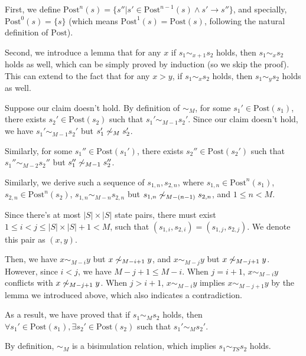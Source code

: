 First, we define $\text{Post}^{n}(s)=\{s'' | s' \in \text{Post}^{n-1}(s) \wedge s' \to s'' \}$, and
specially, $\text{Post}^{0}(s)=\{s\}$ (which means $\text{Post}^{1}(s)=\text{Post}(s)$, following the
natural definition of $\text{Post}$).

Second, we introduce a lemma that for any $x$ if $s_1 \sim_{x + 1} s_2$ holds, then
$s_1 \sim_{x} s_2$ holds as well, which can be simply proved by induction (so we skip the proof).
This can extend to the fact that for any $x > y$, if $s_1 \sim_{x} s_2$ holds, then $s_1 \sim_{y} s_2$ holds as well.

Suppose our claim doesn't hold. By definition of $\sim_{M}$, for some $s_1' \in \text{Post}(s_1)$, there
exists $s_2' \in \text{Post}(s_2)$ such that $s_1' \sim_{M -1} s_2'$.
Since our claim doesn't hold, we have $s_1' \sim_{M-1} s_2'$ but $s_1' \not \sim_{M} s_2'$.

Similarly, for some $s_1'' \in \text{Post}(s_1')$, there exists $s_2'' \in \text{Post}(s_2')$ such that
$s_1'' \sim_{M-2} s_2''$ but $s_1'' \not \sim_{M-1} s_2''$.

Similarly, we derive such a sequence of $s_{1,n}, s_{2,n}$,
where $s_{1,n} \in \text{Post}^{n}(s_1)$, $s_{2,n} \in \text{Post}^{n}(s_2)$,
$s_{1,n} \sim_{M-n} s_{2,n}$ but $s_{1,n} \not \sim_{M-(n-1)} s_{2,n}$, and $1 \leq n < M$.

Since there's at most $|S| \times |S|$ state pairs, there must exist $1 \leq i < j \leq |S| \times |S| + 1 < M$,
such that $(s_{1,i}, s_{2,i}) = (s_{1,j}, s_{2,j})$. We denote this pair as $(x, y)$.

Then, we have $x \sim_{M - i} y$ but $x \not \sim_{M - i + 1} y$, and $x \sim_{M - j} y$ but $x \not \sim_{M - j + 1} y$.
However, since $i < j$, we have $M - j + 1 \le M - i$. When $j = i + 1$, $x \sim_{M - i} y$ conflicts with
$x \not \sim_{M - j + 1} y$. When $j > i + 1$, $x \sim_{M - i} y$ implies $x \sim_{M - j + 1} y$ by the lemma we introduced above,
which also indicates a contradiction.

As a result, we have proved that if $s_1 \sim_{M} s_2$ holds, then
$\forall s_1' \in \text{Post}(s_1), \exists s_2' \in \text{Post}(s_2)$ such that $s_1' \sim_{M} s_2'$.

By definition, $\sim_{M}$ is a bisimulation relation, which implies $s_1 \sim_{TS} s_2$ holds.
